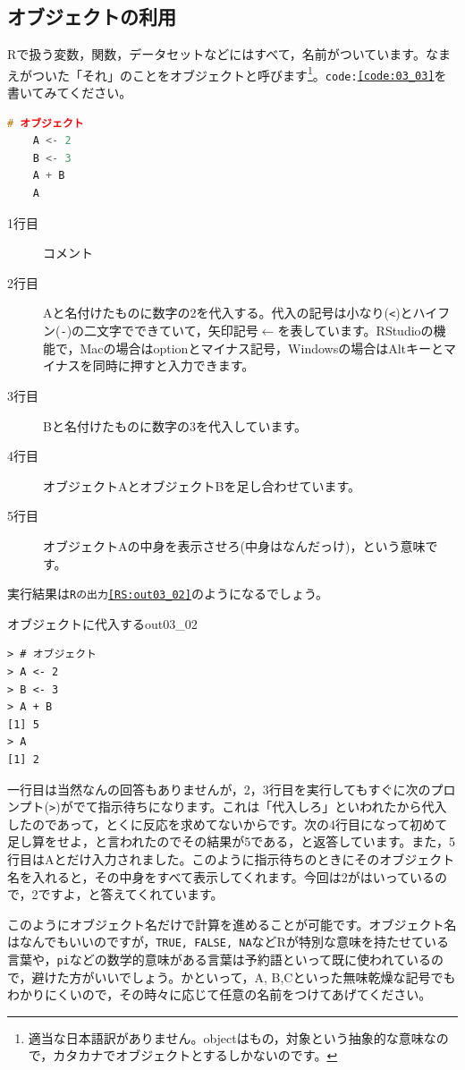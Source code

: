 \documentclass{ltjsbook}
\begin{document}
\subsection{オブジェクトの利用}
Rで扱う変数，関数，データセットなどにはすべて，名前がついています。なまえがついた「それ」のことをオブジェクトと呼びます\footnote{適当な日本語訳がありません。objectはもの，対象という抽象的な意味なので，カタカナでオブジェクトとするしかないのです。}。\texttt{code:\ref{code:03_03}}を書いてみてください。
\begin{lstlisting}[language=c++,label={code:03_03},caption={オブジェクトに代入}]
	# オブジェクト
	A <- 2
	B <- 3
	A + B
	A
\end{lstlisting}
\begin{description}
	\item[1行目] コメント
	\item[2行目] Aと名付けたものに数字の2を代入する。代入の記号は小なり(\verb|<|)とハイフン(\verb|-|)の二文字でできていて，矢印記号$\leftarrow$を表しています。RStudioの機能で，Macの場合はoptionとマイナス記号，Windowsの場合はAltキーとマイナスを同時に押すと入力できます。
	\item[3行目] Bと名付けたものに数字の3を代入しています。
	\item[4行目] オブジェクトAとオブジェクトBを足し合わせています。
	\item[5行目] オブジェクトAの中身を表示させろ(中身はなんだっけ)，という意味です。
\end{description}

実行結果は\texttt{Rの出力\ref{RS:out03_02}}のようになるでしょう。
\begin{Rscreen}{オブジェクトに代入する}{out03_02}
	\begin{verbatim}
> # オブジェクト
> A <- 2
> B <- 3
> A + B
[1] 5
> A 
[1] 2
\end{verbatim}
\end{Rscreen}
一行目は当然なんの回答もありませんが，2，3行目を実行してもすぐに次のプロンプト(\verb|>|)がでて指示待ちになります。これは「代入しろ」といわれたから代入したのであって，とくに反応を求めてないからです。次の4行目になって初めて足し算をせよ，と言われたのでその結果が5である，と返答しています。また，5行目はAとだけ入力されました。このように指示待ちのときにそのオブジェクト名を入れると，その中身をすべて表示してくれます。今回は2がはいっているので，2ですよ，と答えてくれています。

このようにオブジェクト名だけで計算を進めることが可能です。オブジェクト名はなんでもいいのですが，\texttt{TRUE, FALSE, NA}などRが特別な意味を持たせている言葉や，\texttt{pi}などの数学的意味がある言葉は予約語といって既に使われているので，避けた方がいいでしょう。かといって，A, B,Cといった無味乾燥な記号でもわかりにくいので，その時々に応じて任意の名前をつけてあげてください。
\end{document}
